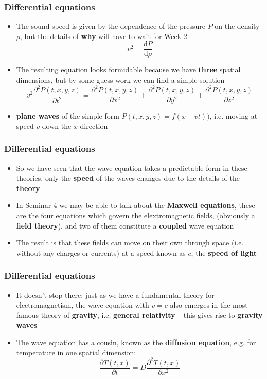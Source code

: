 \documentclass{beamer}
\begin{document}
\begin{frame}
  \frametitle{Differential equations}
  \begin{itemize}
    \item<1-> The sound speed is given by the dependence of the pressure $P$ on the density $\rho$, but the details of \textbf{why} will have to wait for Week 2
      \begin{equation*}
	v^2=\frac{\mathrm{d}P}{\mathrm{d}\rho}
      \end{equation*}
    \item<2-> The resulting equation looks formidable because we have \textbf{three} spatial dimensions, but by some guess-work we can find a simple solution
      \begin{equation*}
	v^2\frac{\partial^2P(t,x,y,z)}{\partial t^2}=\frac{\partial^2P(t,x,y,z)}{\partial x^2}+\frac{\partial^2P(t,x,y,z)}{\partial y^2}+\frac{\partial^2P(t,x,y,z)}{\partial z^2}
      \end{equation*}
    \item<3-> \textbf{plane waves} of the simple form $P(t,x,y,z)=f(x-vt))$, i.e. moving at speed $v$ down the $x$ direction
  \end{itemize}
\end{frame}

\begin{frame}
  \frametitle{Differential equations}
  \begin{itemize}
    \item<1-> So we have seen that the wave equation takes a predictable form in these theories, only the \textbf{speed} of the waves changes due to the details of the \textbf{theory}
    \item<2-> In Seminar 4 we may be able to talk about the \textbf{Maxwell equations}, these are the four equations which govern the elextromagnetic fields, (obviously a \textbf{field theory}), and two of them constitute a \textbf{coupled} wave equation
    \item<3-> The result is that these fields can move on their own through space (i.e. without any charges or currents) at a speed known as $c$, the \textbf{speed of light}
  \end{itemize}
\end{frame}

\begin{frame}
  \frametitle{Differential equations}
  \begin{itemize}
    \item<1-> It doesn't stop there: just as we have a fundamental theory for electromagnetism, the wave equation with $v=c$ also emerges in the most famous theory of \textbf{gravity}, i.e. \textbf{general relativity} -- this gives rise to \textbf{gravity waves}
    \item<2-> The wave equation has a cousin, known as the \textbf{diffusion equation}, e.g. for temperature in one spatial dimension:
      \begin{equation*}
	\frac{\partial T(t,x)}{\partial t}=D\frac{\partial^2 T(t,x)}{\partial x^2}
      \end{equation*}
  \end{itemize}
\end{frame}
\end{document}
